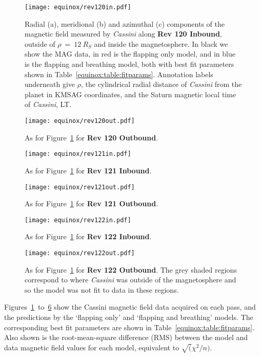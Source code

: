 \begin{figure}
\centering
\texttt{[image: equinox/rev120in.pdf]}
\caption[\textit{Cassini} MAG data, FO and F{\&}B model predictions for Rev 120 Inbound.]{Radial (a), meridional (b) and azimuthal (c) components of the magnetic field measured by \textit{Cassini} along \textbf{Rev 120 Inbound}, outside of $\rho~{=}~\SI{12}{R_S}$ and inside the magnetosphere. In black we show the MAG data, in red is the flapping only model, and in blue is the flapping and breathing model, both with best fit parameters shown in Table~\ref{equinox:table:fitparams}. Annotation labels underneath give $\rho$, the cylindrical radial distance of \textit{Cassini} from the planet in KMSAG coordinates, and the Saturn magnetic local time of \textit{Cassini}, LT.}
\label{equinox:fig:rev120in}
\end{figure}
\begin{figure}
\centering
\texttt{[image: equinox/rev120out.pdf]}
\caption[\textit{Cassini} MAG data, FO and F{\&}B model predictions for Rev 120 Outbound.]{As for Figure~\ref{equinox:fig:rev120in} for \textbf{Rev 120 Outbound}.}
\label{equinox:fig:rev120out}
\end{figure}
\begin{figure}
\centering
\texttt{[image: equinox/rev121in.pdf]}
\caption[\textit{Cassini} MAG data, FO and F{\&}B model predictions for Rev 121 Inbound.]{As for Figure~\ref{equinox:fig:rev120in} for \textbf{Rev 121 Inbound}.}
\label{equinox:fig:rev121in}
\end{figure}
\begin{figure}
\centering
\texttt{[image: equinox/rev121out.pdf]}
\caption[\textit{Cassini} MAG data, FO and F{\&}B model predictions for Rev 121 Outbound.]{As for Figure~\ref{equinox:fig:rev120in} for \textbf{Rev 121 Outbound}.}
\label{equinox:fig:rev121out}
\end{figure}
\begin{figure}
\centering
\texttt{[image: equinox/rev122in.pdf]}
\caption[\textit{Cassini} MAG data, FO and F{\&}B model predictions for Rev 122 Inbound.]{As for Figure~\ref{equinox:fig:rev120in} for \textbf{Rev 122 Inbound}.}
\label{equinox:fig:rev122in}
\end{figure}
\begin{figure}
\centering
\texttt{[image: equinox/rev122out.pdf]}
\caption[\textit{Cassini} MAG data, FO and F{\&}B model predictions for Rev 122 Outbound.]{As for Figure~\ref{equinox:fig:rev120in} for \textbf{Rev 122 Outbound}. The grey shaded regions correspond to where \textit{Cassini} was outside of the magnetosphere and so the model was not fit to data in these regions.}
\label{equinox:fig:rev122out}
\end{figure}
Figures~\ref{equinox:fig:rev120in}~to~\ref{equinox:fig:rev122out} show the Cassini magnetic field data acquired on each pass, and the predictions by the `flapping only' and `flapping and breathing' models. The corresponding best fit parameters are shown in Table~\ref{equinox:table:fitparams}. Also shown is the root-mean-square difference (RMS) between the model and data magnetic field values for each model, equivalent to $\sqrt( \chi^2/n)$.

